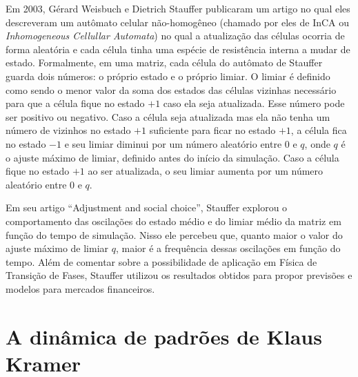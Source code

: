 \documentclass[
	12pt,				%
	openright,			%
	twoside,			%
	a4paper,			%
	english,			%
	french,				%
	spanish,			%
	brazil				%
	]{abntex2}
\begin{document}
Em 2003, Gérard Weisbuch e Dietrich Stauffer \cite{stauffer} publicaram um artigo no qual eles descreveram um autômato celular não-homogêneo (chamado por eles de InCA ou \textit{Inhomogeneous Cellullar Automata}) no qual a atualização das células ocorria de forma aleatória e cada célula tinha uma espécie de resistência interna a mudar de estado. Formalmente, em uma matriz, cada célula do autômato de Stauffer guarda dois números: o próprio estado e o próprio limiar. O limiar é definido como sendo o menor valor da soma dos estados das células vizinhas necessário para que a célula fique no estado $+1$ caso ela seja atualizada. Esse número pode ser positivo ou negativo. Caso a célula seja atualizada mas ela não tenha um número de vizinhos no estado $+1$ suficiente para ficar no estado $+1$, a célula fica no estado $-1$ e seu limiar diminui por um número aleatório entre $0$ e $q$, onde $q$ é o ajuste máximo de limiar, definido antes do início da simulação. Caso a célula fique no estado $+1$ ao ser atualizada, o seu limiar aumenta por um número aleatório entre $0$ e $q$.

Em seu artigo ``Adjustment and social choice'', Stauffer explorou o comportamento das oscilações do estado médio e do limiar médio da matriz em função do tempo de simulação. Nisso ele percebeu que, quanto maior o valor do ajuste máximo de limiar $q$, maior é a frequência dessas oscilações em função do tempo. Além de comentar sobre a possibilidade de aplicação em Física de Transição de Fases, Stauffer utilizou os resultados obtidos para propor previsões e modelos para mercados financeiros.

\section*{A dinâmica de padrões de Klaus Kramer}
\end{document}
